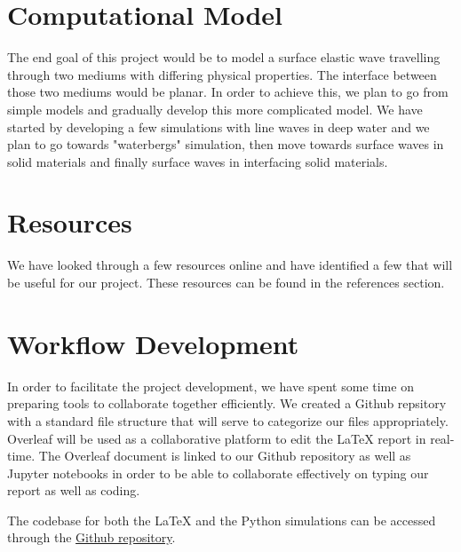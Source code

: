\section{Computational Model}
The end goal of this project would be to model a surface elastic wave travelling through two mediums with differing physical properties. The interface between those two mediums would be planar. In order to achieve this, we plan to go from simple models and gradually develop this more complicated model. We have started by developing a few simulations with line waves in deep water and we plan to go towards "waterbergs" simulation, then move towards surface waves in solid materials and finally surface waves in interfacing solid materials.

\section{Resources}
We have looked through a few resources online and have identified a few that will be useful for our project. These resources can be found in the references section.

\section{Workflow Development}
In order to facilitate the project development, we have spent some time on preparing tools to collaborate together efficiently. We created a Github repsitory with a standard file structure that will serve to categorize our files appropriately. Overleaf will be used as a collaborative platform to edit the \LaTeX{} report in real-time. The Overleaf document is linked to our Github repository as well as Jupyter notebooks in order to be able to collaborate effectively on typing our report as well as coding.

The codebase for both the \LaTeX{} and the Python simulations can be accessed through the \href{https://github.com/dreneuw/AMATH361-Project}{Github repository}.
